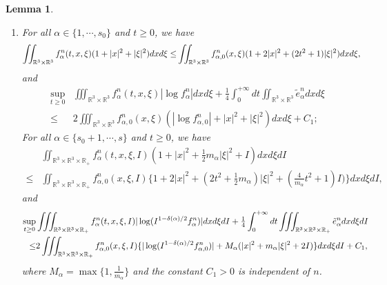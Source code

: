 \documentclass[10pt,a4paper]{amsart}
\newtheorem{lemma}{Lemma}
\def\R{\mathbb{R}}
\begin{document}
\begin{lemma}
\begin{enumerate}
\item{For all $\alpha \in \{1,\cdots,s_0\}$ and $t \geq 0$, we have
	\begin{equation}\label{FB2}{\small
		\begin{aligned}
  \iint_{ \R^3 \times \R^3} f^n_\alpha (t,x,\xi)(1+|x|^2+|\xi|^2)dxd\xi \leq & \iint_{ \R^3 \times \R^3} f^n_{\alpha,0}(x,\xi)(1+2|x|^2+(2t^2+1)|\xi|^2)dxd\xi,
  \end{aligned}}
	\end{equation}
and
 \begin{equation}\label{FWC2}
		\begin{aligned}
			\sup \limits_{t\geq 0}&\iiint_{ \R^3 \times \R^3} f^n_\alpha(t,x,\xi)|\log f^n_\alpha| dxd\xi +\tfrac{1}{4}\int_{0}^{+\infty} dt \iint_{ \R^3 \times \R^3} \tilde{e}^n_\alpha dxd\xi \\
		   \leq & 2 \iiint_{ \R^3 \times \R^3} f^n_{\alpha,0}(x,\xi) (|\log f^n_{\alpha,0}|+ |x|^2+ |\xi|^2 )dxd\xi +C_1;
		\end{aligned}
	\end{equation}
	For all $\alpha \in \{s_0+1,\cdots,s\}$ and $t \geq 0$, we have
	\begin{equation}\label{FB3}
		\begin{aligned}
   &\iint_{ \R^3 \times \R^3\times \R_+ } f^n_\alpha (t,x,\xi,I)(1+|x|^2+ \tfrac{1}{2} m_\alpha |\xi|^2+I)dxd\xi dI\\
  \leq & \iint_{ \R^3 \times \R^3\times \R_+ } f^n_{\alpha,0}(x,\xi,I ) \{ 1 + 2 |x|^2 + ( 2 t^2 + \tfrac{1}{2} m_\alpha ) |\xi|^2 + (\tfrac{4}{m_\alpha} t^2 + 1) I )\} dxd\xi dI,
\end{aligned}
\end{equation}
and
 \begin{equation}\label{FWC3}{\small
		\begin{aligned}
			\sup \limits_{t\geq 0}& \iiint_{ \R^3 \times \R^3\times \R_+} f^n_\alpha(t,x,\xi,I) |\log (I^{1-\delta(\alpha)/2}f^n_\alpha)| dxd\xi dI +\tfrac{1}{4}\int_{0}^{+\infty} dt \iiint_{ \R^3 \times \R^3\times \R_+} \tilde{e}^n_\alpha dxd\xi dI\\
		\leq & 2 \iiint_{ \R^3 \times \R^3\times \R_+} f^n_{\alpha,0}(x,\xi,I )\{|\log (I^{1-\delta(\alpha)/2}f^n_{\alpha,0})|+ M_\alpha(|x|^2+m_\alpha |\xi|^2 +2I)\}dxd\xi dI+C_1,
		\end{aligned}}
\end{equation}
where $M_\alpha = \max \{1,\frac{1}{m_\alpha}\}$ and the constant $C_1>0$ is independent of $n$.}\label{3 of Lemma 4.17}
\end{enumerate}
\end{lemma}
\end{document}
